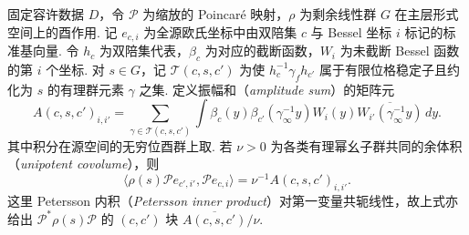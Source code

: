 \begin{lemma}
\label{lem:b-amplitude-blocks}
\emitthmsource
固定容许数据 $D$，令 $\mathcal P$ 为缩放的
Poincaré 映射，$\rho$ 为剩余线性群 $G$ 在主层形式空间上的酉作用.
记 $e_{c,i}$ 为全源欧氏坐标中由双陪集 $c$ 与 Bessel 坐标 $i$ 标记的标准基向量.
令 $h_c$ 为双陪集代表，$\beta_c$ 为对应的截断函数，$W_i$ 为未截断
Bessel 函数的第 $i$ 个坐标. 对 $s\in G$，记 $\mathcal T(c,s,c')$ 为使
$h_c^{-1}\gamma_f h_{c'}$ 属于有限位格稳定子且约化为 $s$ 的有理群元素 $\gamma$ 之集.
定义振幅和（\emph{amplitude sum}）的矩阵元
\[
 A(c,s,c')_{i,i'}
 =\sum_{\gamma\in\mathcal T(c,s,c')}\!
   \int \beta_c(y)\beta_{c'}(\gamma_\infty^{-1}y)
     W_i(y)\overline{W_{i'}(\gamma_\infty^{-1}y)}\,dy .
\]
其中积分在源空间的无穷位酉群上取. 若 $\nu>0$ 为各类有理幂幺子群共同的余体积（\emph{unipotent covolume}），则
\[
 \langle \rho(s)\mathcal P e_{c',i'},\mathcal P e_{c,i}\rangle
 =\nu^{-1} A(c,s,c')_{i,i'} .
\]
这里 Petersson 内积（\emph{Petersson inner product}）对第一变量共轭线性，故上式亦给出
$\mathcal P^*\rho(s)\mathcal P$ 的 $(c,c')$ 块
$\overline{A(c,s,c')}/\nu$.
\end{lemma}
